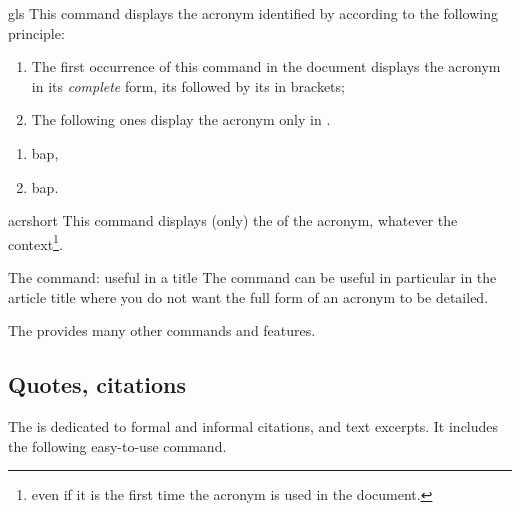 \documentclass[english,nolocaltoc]{nwejmart}
\newtheorem[style=definition]{fact}
\newtheorem[title-plural=Criteria]{criterion}
\newtheorem[title=random experiment]{rexp}
\begin{document}
\begin{docCommand}{gls}{}
  This command displays the acronym identified by 
  according to the following principle:
  \begin{enumerate}
  \item The first occurrence of this command in the document displays
    the acronym in its \emph{complete} form, \ie*{} its  followed by its  in brackets;
  \item The following ones  display the acronym only in .
  \end{enumerate}
\end{docCommand}

\begin{preamblecode}[listing options={alsolanguage={[glossaries]TeX}}]
\end{preamblecode}
\begin{bodycode}[listing and text,listing options={alsolanguage={[glossaries]TeX}}]
\begin{enumerate}
\item \gls{bap},
\item \gls{bap}.
\end{enumerate}
\end{bodycode}

\begin{docCommand}{acrshort}{}
  This command displays  (only)  the  of the acronym,
  whatever the  context\footnote{\Ie*{} even if it is the first time the acronym is used in the  document.}.
\end{docCommand}

\begin{dbremark}{The  command: useful in a title}{}
  The  command can be useful in particular in the
  article title where you do not want the full form of an acronym to
  be detailed.
\end{dbremark}

The  provides many other commands and
features\autocite[For more  details, see for instance][]{Bitouze7}.

\subsection{Quotes, citations}
\label{sec-guillemets-citations}

The  is dedicated to formal and informal citations,
and text excerpts. It includes the following easy-to-use 
command.
\end{document}
